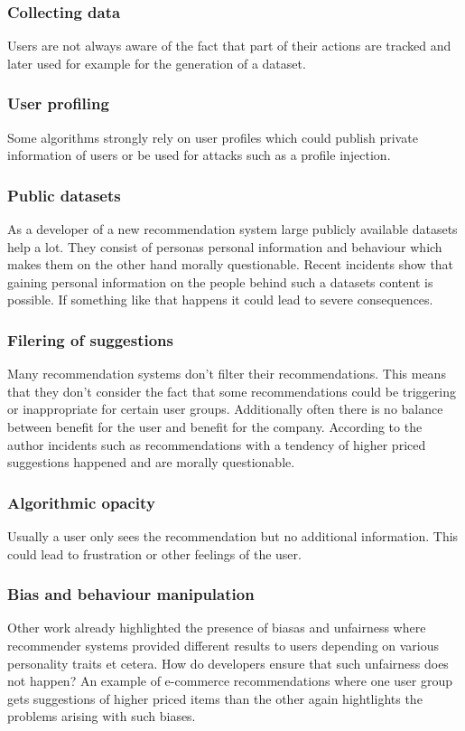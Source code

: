 \documentclass[runningheads,a4paper]{llncs}
\begin{document}
\subsubsection{Collecting data}
Users are not always aware of the fact that part of their actions are tracked and later used for example for the generation of a dataset.
\subsubsection{User profiling} 
Some algorithms strongly rely on user profiles which could publish private information of users or be used for attacks such as a profile injection.
\subsubsection{Public datasets}
As a developer of a new recommendation system large publicly available datasets help a lot.
They consist of personas personal information and behaviour which makes them on the other hand morally questionable.
Recent incidents show that gaining personal information on the people behind such a datasets content is possible. If something like that happens it could lead to severe consequences.
\subsubsection{Filering of suggestions}
Many recommendation systems don't filter their recommendations.
This means that they don't consider the fact that some recommendations could be triggering or inappropriate for certain user groups.
Additionally often there is no balance between benefit for the user and benefit for the company. According to the author incidents such as recommendations with a tendency of higher priced suggestions happened and are morally questionable.
\subsubsection{Algorithmic opacity}
Usually a user only sees the recommendation but no additional information. This could lead to frustration or other feelings of the user.
\subsubsection{Bias and behaviour manipulation}  
Other work already highlighted the presence of biasas and unfairness where recommender systems provided different results to users depending on various personality traits et cetera. 
How do developers ensure that such unfairness does not happen? An example of e-commerce recommendations where one user group gets suggestions of higher priced items than the other again hightlights the problems arising with such biases. 
\end{document}
